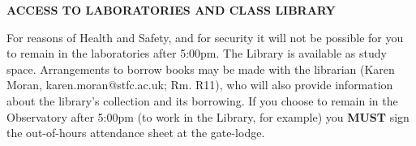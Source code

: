 \documentclass[12pt]{article}
\begin{document}
\bigskip 

\noindent
{\bf ACCESS TO LABORATORIES AND CLASS LIBRARY}
\vspace*{0.3cm}

\noindent
For reasons of Health and Safety, and for security it will not be possible for you to remain in the laboratories after 5:00pm. The Library is available as study space. Arrangements to borrow books may be made with the librarian (Karen Moran, karen.moran@stfc.ac.uk; Rm. R11), who will also provide information about the library's collection and its borrowing. If you choose to remain in the Observatory after 5:00pm (to work in the Library, for example) you {\bf MUST} sign the out-of-hours attendance sheet at the gate-lodge.


\end{document}
